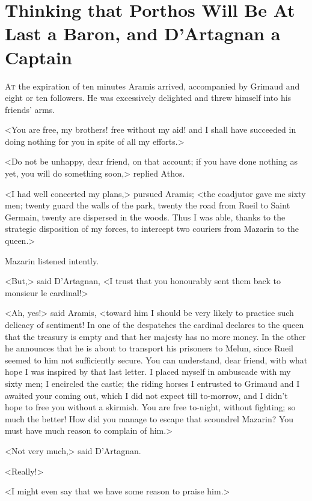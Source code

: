 \chapter[Porthos Will Be At Last a Baron, and D'Artagnan a Captain]{Thinking that Porthos Will Be At Last a Baron, and D'Artagnan a Captain}
	


 \lettrine{A}{t} the expiration of ten minutes Aramis arrived, accompanied by Grimaud and eight or ten followers. He was excessively delighted and threw himself into his friends' arms.

\zz
<You are free, my brothers! free without my aid! and I shall have succeeded in doing nothing for you in spite of all my efforts.>

<Do not be unhappy, dear friend, on that account; if you have done nothing as yet, you will do something soon,> replied Athos.

<I had well concerted my plans,> pursued Aramis; <the coadjutor gave me sixty men; twenty guard the walls of the park, twenty the road from Rueil to Saint Germain, twenty are dispersed in the woods. Thus I was able, thanks to the strategic disposition of my forces, to intercept two couriers from Mazarin to the queen.>

Mazarin listened intently.

<But,> said D'Artagnan, <I trust that you honourably sent them back to monsieur le cardinal!>

<Ah, yes!> said Aramis, <toward him I should be very likely to practice such delicacy of sentiment! In one of the despatches the cardinal declares to the queen that the treasury is empty and that her majesty has no more money. In the other he announces that he is about to transport his prisoners to Melun, since Rueil seemed to him not sufficiently secure. You can understand, dear friend, with what hope I was inspired by that last letter. I placed myself in ambuscade with my sixty men; I encircled the castle; the riding horses I entrusted to Grimaud and I awaited your coming out, which I did not expect till to-morrow, and I didn't hope to free you without a skirmish. You are free to-night, without fighting; so much the better! How did you manage to escape that scoundrel Mazarin? You must have much reason to complain of him.>

<Not very much,> said D'Artagnan.

<Really!>

<I might even say that we have some reason to praise him.>

